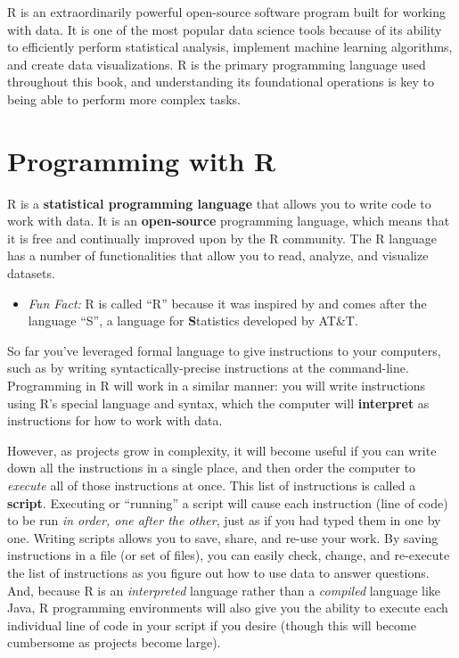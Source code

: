 \documentclass[]{book}
\providecommand{\tightlist}{%
  \setlength{\itemsep}{0pt}\setlength{\parskip}{0pt}}
\theoremstyle{definition}
\theoremstyle{definition}
\theoremstyle{remark}
\begin{document}
R is an extraordinarily powerful open-source software program built for
working with data. It is one of the most popular data science tools
because of its ability to efficiently perform statistical analysis,
implement machine learning algorithms, and create data visualizations. R
is the primary programming language used throughout this book, and
understanding its foundational operations is key to being able to
perform more complex tasks.

\section{Programming with R}\label{programming-with-r}

R is a \textbf{statistical programming language} that allows you to
write code to work with data. It is an \textbf{open-source} programming
language, which means that it is free and continually improved upon by
the R community. The R language has a number of functionalities that
allow you to read, analyze, and visualize datasets.

\begin{itemize}
\tightlist
\item
  \emph{Fun Fact:} R is called ``R'' because it was inspired by and
  comes after the language ``S'', a language for \textbf{S}tatistics
  developed by AT\&T.
\end{itemize}

So far you've leveraged formal language to give instructions to your
computers, such as by writing syntactically-precise instructions at the
command-line. Programming in R will work in a similar manner: you will
write instructions using R's special language and syntax, which the
computer will \textbf{interpret} as instructions for how to work with
data.

However, as projects grow in complexity, it will become useful if you
can write down all the instructions in a single place, and then order
the computer to \emph{execute} all of those instructions at once. This
list of instructions is called a \textbf{script}. Executing or
``running'' a script will cause each instruction (line of code) to be
run \emph{in order, one after the other}, just as if you had typed them
in one by one. Writing scripts allows you to save, share, and re-use
your work. By saving instructions in a file (or set of files), you can
easily check, change, and re-execute the list of instructions as you
figure out how to use data to answer questions. And, because R is an
\emph{interpreted} language rather than a \emph{compiled} language like
Java, R programming environments will also give you the ability to
execute each individual line of code in your script if you desire
(though this will become cumbersome as projects become large).
\end{document}
